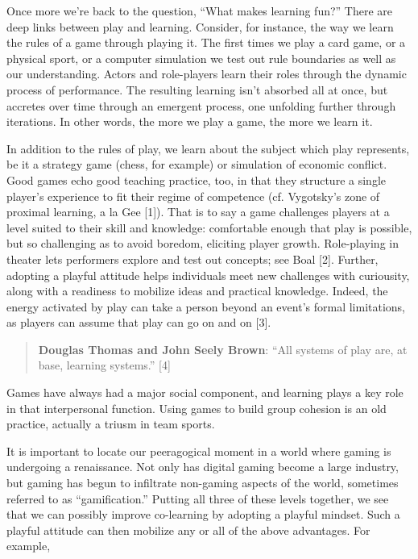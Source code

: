 Once more we're back to the question, ``What makes learning fun?'' There
are deep links between play and learning. Consider, for instance, the
way we learn the rules of a game through playing it. The first times we
play a card game, or a physical sport, or a computer simulation we test
out rule boundaries as well as our understanding. Actors and
role-players learn their roles through the dynamic process of
performance. The resulting learning isn't absorbed all at once, but
accretes over time through an emergent process, one unfolding further
through iterations. In other words, the more we play a game, the more we
learn it.

In addition to the rules of play, we learn about the subject which play
represents, be it a strategy game (chess, for example) or simulation of
economic conflict. Good games echo good teaching practice, too, in that
they structure a single player's experience to fit their regime of
competence (cf. Vygotsky's zone of proximal learning, a la Gee {[}1{]}).
That is to say a game challenges players at a level suited to their
skill and knowledge: comfortable enough that play is possible, but so
challenging as to avoid boredom, eliciting player growth. Role-playing
in theater lets performers explore and test out concepts; see Boal
{[}2{]}. Further, adopting a playful attitude helps individuals meet new
challenges with curiousity, along with a readiness to mobilize ideas and
practical knowledge. Indeed, the energy activated by play can take a
person beyond an event's formal limitations, as players can assume that
play can go on and on {[}3{]}.

\begin{quote}
\textbf{Douglas Thomas and John Seely Brown}: ``All systems of play are,
at base, learning systems.'' {[}4{]}
\end{quote}

Games have always had a major social component, and learning plays a key
role in that interpersonal function. Using games to build group cohesion
is an old practice, actually a triusm in team sports.

It is important to locate our peeragogical moment in a world where
gaming is undergoing a renaissance. Not only has digital gaming become a
large industry, but gaming has begun to infiltrate non-gaming aspects of
the world, sometimes referred to as ``gamification.'' Putting all three
of these levels together, we see that we can possibly improve
co-learning by adopting a playful mindset. Such a playful attitude can
then mobilize any or all of the above advantages. For example,

